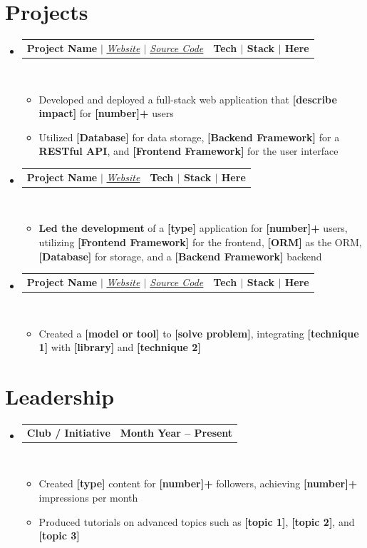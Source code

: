 \documentclass[letterpaper,11pt]{article}
\makeatletter
\newcommand{\resumeItem}[1]{
  \item\small{
    {#1 \vspace{0pt}}
  }
}
\newcommand{\resumeProjectHeading}[2]{
    \item
    \begin{tabular*}{1.001\textwidth}{l@{\extracolsep{\fill}}r}
      \small#1 & \textbf{\small #2}\\
    \end{tabular*}\vspace{-7pt}
}
\newcommand{\resumeSubHeadingListStart}{\begin{itemize}[leftmargin=0.0in, label={}]}
\newcommand{\resumeSubHeadingListEnd}{\end{itemize}}\vspace{0pt}
\newcommand{\resumeItemListStart}{\begin{itemize}}
\newcommand{\resumeItemListEnd}{\end{itemize}\vspace{-5pt}}
\makeatother
\begin{document}
\section{Projects}
    \vspace{-5pt}
    \resumeSubHeadingListStart
    \resumeProjectHeading
            {\textbf{{Project Name}} $|$ \emph{\href{https://your-project.vercel.app/}{Website}{ $|$ }\href{https://github.com/your-username/your-repo}{Source Code}}}{Tech $|$ Stack $|$ Here}
            \\[5mm]
          \resumeItemListStart
            \resumeItem{Developed and deployed a full-stack web application that \textbf{[describe impact]} for \textbf{[number]+} users}
            \resumeItem{Utilized \textbf{[Database]} for data storage, \textbf{[Backend Framework]} for a \textbf{RESTful API}, and \textbf{[Frontend Framework]} for the user interface}
          \resumeItemListEnd
 \vspace{-20pt}
 \resumeProjectHeading
            {\textbf{{Project Name}} $|$ \emph{\href{https://your-project.com/}{Website}}}{Tech $|$ Stack $|$ Here}
            \\[5mm]
          \resumeItemListStart
            \resumeItem{\textbf{Led the development} of a \textbf{[type]} application for \textbf{[number]+} users, utilizing \textbf{[Frontend Framework]} for the frontend, \textbf{[ORM]} as the ORM, \textbf{[Database]} for storage, and a \textbf{[Backend Framework]} backend}
          \resumeItemListEnd
 \vspace{-17pt}
 \resumeProjectHeading
{\textbf{{Project Name}} $|$ \emph{\href{https://your-project.vercel.app/}{Website}{ $|$ }\href{https://github.com/your-username/your-repo}{Source Code}}}{Tech $|$ Stack $|$ Here}
\\[5mm]
\resumeItemListStart
\resumeItem{Created a \textbf{[model or tool]} to \textbf{[solve problem]}, integrating \textbf{[technique 1]} with \textbf{[library]} and \textbf{[technique 2]}}
\resumeItemListEnd

\resumeSubHeadingListEnd
\vspace{-20pt}
\section{Leadership}
    \vspace{-5pt}
    \resumeSubHeadingListStart
                   \resumeProjectHeading
            {\textbf{{Club / Initiative}} }{Month Year -- Present}
            \\[5mm]
          \resumeItemListStart
            \resumeItem{Created \textbf{[type]} content for \textbf{[number]+} followers, achieving \textbf{[number]+} impressions per month}
            \resumeItem{Produced tutorials on advanced topics such as \textbf{[topic 1]}, \textbf{[topic 2]}, and \textbf{[topic 3]}}
          \resumeItemListEnd
          \resumeSubHeadingListEnd
 \vspace{-12pt}
\end{document}
